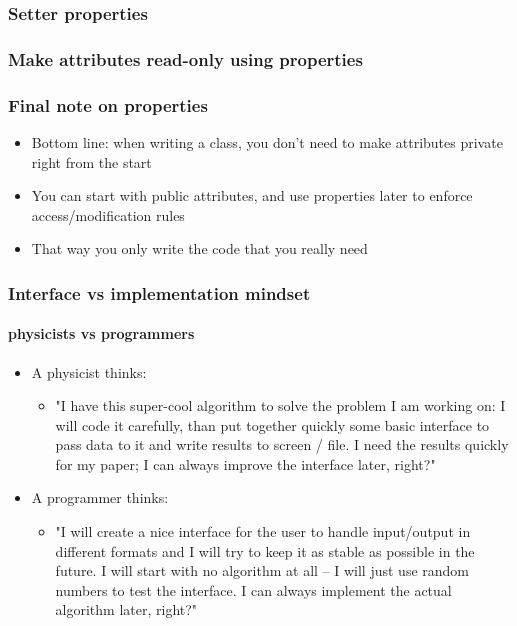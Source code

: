 \documentclass[9pt]{beamer}
\begin{document}
\begin{frame}
  \frametitle{Setter properties}
  
\end{frame}

\begin{frame}
  \frametitle{Make attributes read-only using properties}
  
\end{frame}

\begin{frame}
\frametitle{Final note on properties}
  \begin{itemize}
    \item Bottom line: when writing a class, you don't need to make attributes
          private right from the start
    \medskip
    \item You can start with public attributes, and use properties later to
          enforce access/modification rules
    \medskip
    \item That way you only write the code that you really need
  \end{itemize}
\end{frame}

\begin{frame}
  \frametitle{Interface vs implementation mindset}
  \framesubtitle{physicists vs programmers}
  
  \begin{itemize}
    
    \item A physicist thinks:
        
    \medskip
      
    \begin{itemize}
      \item "I have this super-cool algorithm to solve the problem I am working on:
             I will code it carefully, than put together quickly some basic 
             interface to pass data to it and write results to screen / file.
             I need the results quickly for my paper; I can always improve the 
             interface later, right?"
    \end{itemize}
    \medskip
      
    \item A programmer thinks:
    
    \medskip
    
    \begin{itemize}
      \item "I will create a nice interface for the user to handle input/output
             in different formats and I will try to keep it as stable as 
             possible in the future.
             I will start with no algorithm at all -- I will just use random
             numbers to test the interface. I can always implement the
             actual algorithm later, right?"
    \end{itemize}

  \end{itemize}

\end{frame}
 
\end{document}
